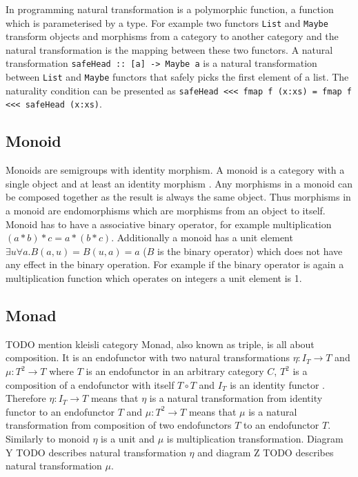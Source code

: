 \documentclass[article]{aaltoseries}
\begin{document}
    In programming natural transformation is a polymorphic function, a function
    which is parameterised by a type. For example two functors \lstinline|List|
    and \lstinline|Maybe| transform objects and morphisms from a category to
    another category and the natural transformation is the mapping between these
    two functors. A natural transformation
    \lstinline|safeHead :: [a] -> Maybe a| is a natural transformation between
    \lstinline|List| and \lstinline|Maybe| functors that safely picks the first
    element of a list. The naturality condition can be presented as
    \lstinline|safeHead <<< fmap f (x:xs) = fmap f <<< safeHead (x:xs)|.

    
  \subsection{Monoid}
    Monoids are semigroups with identity morphism. A monoid is a category with a
    single object and at least an identity morphism \cite{barr1990category,
      awodey2006category, mac2013categories}. Any morphisms in a monoid can be
    composed together as the result is always the same object. Thus morphisms in
    a monoid are endomorphisms which are morphisms from an object to itself.
    Monoid has to have a associative binary operator, for example multiplication
    $(a * b) * c = a * (b * c)$. Additionally a monoid has a unit element
    $\exists u \forall a. B(a,u) = B(u,a) = a$ ($B$ is the binary operator)
    which does not have any effect in the binary operation. For example if the
    binary operator is again a multiplication function which operates on
    integers a unit element is 1.


  \subsection{Monad}
    TODO mention kleisli category
    Monad, also known as triple, is all about composition. It is an endofunctor
    with two natural transformations $\eta : I_T \rightarrow T$ and $\mu : T^2
    \rightarrow T$ where $T$ is an endofunctor in an arbitrary category $C$,
    $T^2$ is a composition of a endofunctor with itself $T \circ T$ and $I_T$ is
    an identity functor \cite{barr1990category, moggi1989computational}.
    Therefore $\eta : I_T \rightarrow T$ means that $\eta$ is a natural
    transformation from identity functor to an endofunctor $T$ and $\mu : T^2
    \rightarrow T$ means that $\mu$ is a natural transformation from composition
    of two endofunctors $T$ to an endofunctor $T$. Similarly to monoid $\eta$ is
    a unit and $\mu$ is multiplication transformation. Diagram Y TODO describes
    natural transformation $\eta$ and diagram Z TODO describes natural
    transformation $\mu$.
    
\end{document}
